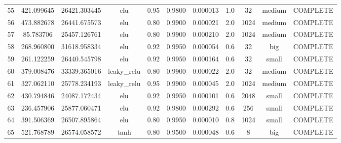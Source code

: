 \begin{longtable}{ccccccccccc}
                       55 &                 421.099645 &                       26421.303445 &             elu &        0.95 & 0.9800 &       0.000013 &             1.0 &       32 &    medium & COMPLETE \\
                       56 &                 473.882678 &                       26441.675573 &             elu &        0.80 & 0.9900 &       0.000021 &             2.0 &     1024 &    medium & COMPLETE \\
                       57 &                  85.783706 &                       25457.126761 &             elu &        0.80 & 0.9900 &       0.000210 &             2.0 &     1024 &    medium & COMPLETE \\
                       58 &                 268.960800 &                       31618.958334 &             elu &        0.92 & 0.9950 &       0.000054 &             0.6 &       32 &       big & COMPLETE \\
                       59 &                 261.122259 &                       26440.545798 &             elu &        0.92 & 0.9950 &       0.000164 &             0.6 &       32 &     small & COMPLETE \\
                       60 &                 379.008476 &                       33339.365016 &     leaky\_relu &        0.80 & 0.9900 &       0.000022 &             2.0 &       32 &    medium & COMPLETE \\
                       61 &                 327.062110 &                       25778.234193 &     leaky\_relu &        0.95 & 0.9900 &       0.000045 &             2.0 &     1024 &    medium & COMPLETE \\
                       62 &                 430.794846 &                       24087.172434 &             elu &        0.92 & 0.9950 &       0.000101 &             0.6 &     2048 &     small & COMPLETE \\
                       63 &                 236.457906 &                       25877.060471 &             elu &        0.92 & 0.9800 &       0.000292 &             0.6 &      256 &     small & COMPLETE \\
                       64 &                 391.506369 &                       26507.895864 &             elu &        0.80 & 0.9950 &       0.000010 &             0.8 &     1024 &     small & COMPLETE \\
                       65 &                 521.768789 &                       26574.058572 &            tanh &        0.80 & 0.9500 &       0.000048 &             0.6 &        8 &       big & COMPLETE \\

\end{longtable}
